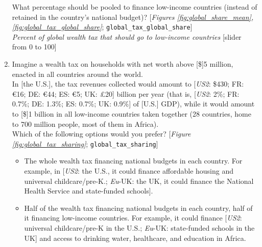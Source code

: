 \begin{enumerate}[resume]
  What percentage should be pooled to finance low-income countries (instead of retained in the country's national budget)?  [\textit{Figures \ref{fig:global_share_mean}, \ref{fig:global_tax_global_share}}; \verb|global_tax_global_share|]
  \\ \textit{Percent of global wealth tax that should go to low-income countries} [slider from 0 to 100]
  \item  \label{q:global_tax_sharing} Imagine a wealth tax on households with net worth above [\$]5 million, enacted in all countries around the world.  \\
  In [the U.S.], the tax revenues collected would amount to [\textit{US2}: \$430; FR: \euro{}16; DE: \euro{}44; ES: \euro{}5; UK: £20] billion per year (that is, [\textit{US2}: 2\%; FR: 0.7\%; DE: 1.3\%; ES: 0.7\%; UK: 0.9\%] of [U.S.] GDP), while it would amount to [\$]1 billion in all low-income countries taken together (28 countries, home to 700 million people, most of them in Africa).  \\ Which of the following options would you prefer?  [\textit{Figure \ref{fig:global_tax_sharing}}; \verb|global_tax_sharing|]
  \begin{itemize}
    \item The whole wealth tax financing national budgets in each country. For example, in [\textit{US2}: the U.S., it could finance affordable housing and universal childcare/pre-K.; \textit{Eu}-UK: the UK, it could finance the National Health Service and state-funded schools].
    \item Half of the wealth tax financing national budgets in each country, half of it financing low-income countries. For example, it could finance [\textit{US2}: universal childcare/pre-K in the U.S.; \textit{Eu}-UK: state-funded schools in the UK] and access to drinking water, healthcare, and education in Africa. 
  \end{itemize}
\end{enumerate}

